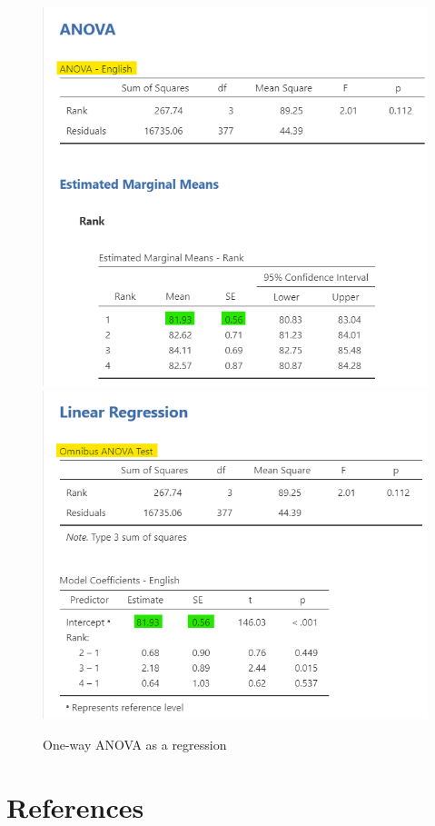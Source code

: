 \documentclass[
]{book}
\begin{document}
\begin{figure}

{\centering \includegraphics[width=0.49\linewidth]{images/14-regression-wrap-up/anova1} \includegraphics[width=0.49\linewidth]{images/14-regression-wrap-up/anova2} 

}

\caption{One-way ANOVA as a regression}\label{fig:unnamed-chunk-4}
\end{figure}

\hypertarget{references}{%
\chapter{References}\label{references}}

  
\end{document}
